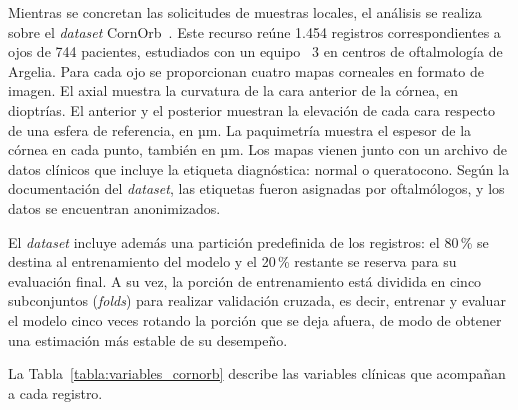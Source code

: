         Mientras se concretan las solicitudes de muestras locales, el análisis se realiza sobre el \textit{dataset} CornOrb~\cite{zenodo}. Este recurso reúne 1.454 registros correspondientes a ojos de 744 pacientes, estudiados con un equipo \Orbscan{}~3 en centros de oftalmología de Argelia. Para cada ojo se proporcionan cuatro mapas corneales en formato de imagen. El axial muestra la curvatura de la cara anterior de la córnea, en dioptrías. El anterior y el posterior muestran la elevación de cada cara respecto de una esfera de referencia, en µm. La paquimetría muestra el espesor de la córnea en cada punto, también en µm. Los mapas vienen junto con un archivo de datos clínicos que incluye la etiqueta diagnóstica: normal o queratocono. Según la documentación del \textit{dataset}, las etiquetas fueron asignadas por oftalmólogos, y los datos se encuentran anonimizados.

        El \textit{dataset} incluye además una partición predefinida de los registros: el 80\,\% se destina al entrenamiento del modelo y el 20\,\% restante se reserva para su evaluación final. A su vez, la porción de entrenamiento está dividida en cinco subconjuntos (\textit{folds}) para realizar validación cruzada, es decir, entrenar y evaluar el modelo cinco veces rotando la porción que se deja afuera, de modo de obtener una estimación más estable de su desempeño.

        La Tabla~\ref{tabla:variables_cornorb} describe las variables clínicas que acompañan a cada registro.

